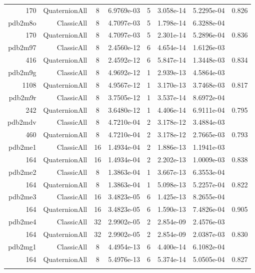 \begin{xltabular}{\textwidth}{r|rcS[table-format=1.4e+2]cS[table-format=1.3e+2]S[table-format=1.4e+2]S[table-format=-1.3]}
170 & QuaternionAll & 8 & 6.9769e-03 & 5 & 3.058e-14 & 5.2295e-04 & 0.826\\  \addlinespace
pdb2m8o & ClassicAll & 8 & 4.7097e-03 & 5 & 1.798e-14 & 6.3288e-04 & \\
170 & QuaternionAll & 8 & 4.7097e-03 & 5 & 2.301e-14 & 5.2896e-04 & 0.836\\  \addlinespace
pdb2m97 & ClassicAll & 8 & 2.4560e-12 & 6 & 4.654e-14 & 1.6126e-03 & \\
416 & QuaternionAll & 8 & 2.4592e-12 & 6 & 5.847e-14 & 1.3448e-03 & 0.834\\  \addlinespace
pdb2m9g & ClassicAll & 8 & 4.9692e-12 & 1 & 2.939e-13 & 4.5864e-03 & \\
1108 & QuaternionAll & 8 & 4.9567e-12 & 1 & 3.170e-13 & 3.7468e-03 & 0.817\\  \addlinespace
pdb2m9r & ClassicAll & 8 & 3.7505e-12 & 1 & 3.537e-14 & 8.6972e-04 & \\
242 & QuaternionAll & 8 & 3.6480e-12 & 1 & 4.406e-14 & 6.9111e-04 & 0.795\\  \addlinespace
pdb2mdv & ClassicAll & 8 & 4.7210e-04 & 2 & 3.178e-12 & 3.4884e-03 & \\
460 & QuaternionAll & 8 & 4.7210e-04 & 2 & 3.178e-12 & 2.7665e-03 & 0.793\\  \addlinespace
pdb2me1 & ClassicAll & 16 & 1.4934e-04 & 2 & 1.886e-13 & 1.1941e-03 & \\
164 & QuaternionAll & 16 & 1.4934e-04 & 2 & 2.202e-13 & 1.0009e-03 & 0.838\\  \addlinespace
pdb2me2 & ClassicAll & 8 & 1.3863e-04 & 1 & 3.667e-13 & 6.3553e-04 & \\
164 & QuaternionAll & 8 & 1.3863e-04 & 1 & 5.098e-13 & 5.2257e-04 & 0.822\\  \addlinespace
pdb2me3 & ClassicAll & 16 & 3.4823e-05 & 6 & 1.425e-13 & 8.2655e-04 & \\
164 & QuaternionAll & 16 & 3.4823e-05 & 6 & 1.590e-13 & 7.4826e-04 & 0.905\\  \addlinespace
pdb2me4 & ClassicAll & 32 & 2.9902e-05 & 2 & 2.854e-09 & 2.4576e-03 & \\
164 & QuaternionAll & 32 & 2.9902e-05 & 2 & 2.854e-09 & 2.0387e-03 & 0.830\\  \addlinespace
pdb2mg1 & ClassicAll & 8 & 4.4954e-13 & 6 & 4.400e-14 & 6.1082e-04 & \\
164 & QuaternionAll & 8 & 5.4976e-13 & 6 & 5.374e-14 & 5.0505e-04 & 0.827\\  \addlinespace

\end{xltabular}
